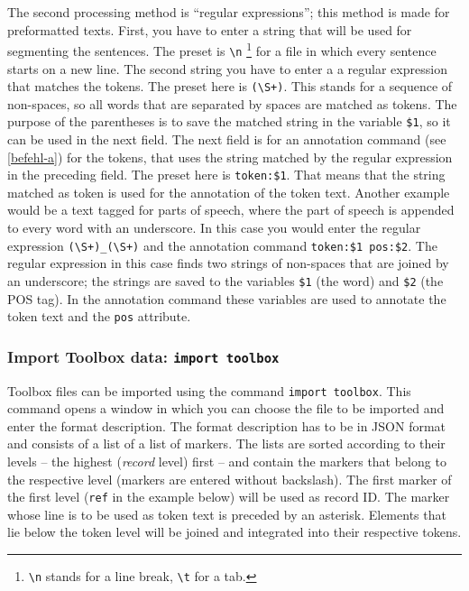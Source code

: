 \documentclass[12pt]{scrartcl}
\begin{document}
The second processing method is “regular expressions”; this method is made for preformatted texts.
First, you have to enter a string that will be used for segmenting the sentences.
The preset is \texttt{{\textbackslash}n} \footnote{\texttt{{\textbackslash}n} stands for a line break, \texttt{{\textbackslash}t} for a tab.} for a file in which every sentence starts on a new line.
The second string you have to enter a a regular expression that matches the tokens.
The preset here is \texttt{({\textbackslash}S+)}.
This stands for a sequence of non-spaces, so all words that are separated by spaces are matched as tokens.
The purpose of the parentheses is to save the matched string in the variable \texttt{\$1}, so it can be used in the next field.
The next field is for an annotation command (see \ref{befehl-a}) for the tokens, that uses the string matched by the regular expression in the preceding field.
The preset here is \texttt{token:\$1}.
That means that the string matched as token is used for the annotation of the token text.
Another example would be a text tagged for parts of speech, where the part of speech is appended to every word with an underscore.
In this case you would enter the regular expression \texttt{({\textbackslash}S+)\_({\textbackslash}S+)} and the annotation command \texttt{token:\$1 pos:\$2}.
The regular expression in this case finds two strings of non-spaces that are joined by an underscore; the strings are saved to the variables \texttt{\$1} (the word) and \texttt{\$2} (the POS tag).
In the annotation command these variables are used to annotate the token text and the \texttt{pos} attribute.


\subsubsection{Import Toolbox data: \texttt{import toolbox}}

Toolbox files can be imported using the command \texttt{import toolbox}.
This command opens a window in which you can choose the file to be imported and enter the format description.
The format description has to be in JSON format and consists of a list of a list of markers.
The lists are sorted according to their levels – the highest (\textit{record} level) first – and contain the markers that belong to the respective level (markers are entered without backslash).
The first marker of the first level (\texttt{ref} in the example below) will be used as record ID.
The marker whose line is to be used as token text is preceded by an asterisk.
Elements that lie below the token level will be joined and integrated into their respective tokens.
\end{document}
